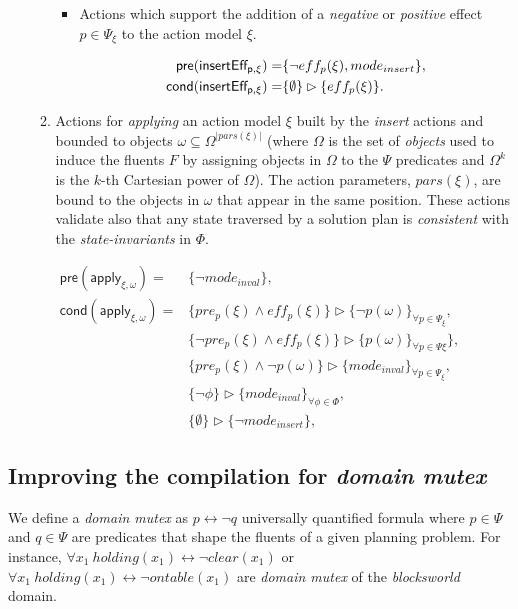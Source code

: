 \documentclass{article}
\newcommand{\pre}{\mathsf{pre}}     %
\newcommand{\cond}{\mathsf{cond}}   %
\begin{document}
\begin{itemize}
\begin{enumerate}
\begin{itemize}
\item Actions which support the addition of a {\em negative} or {\em positive} effect $p\in \Psi_{\xi}$ to the action model $\xi$. 

\begin{small}
\begin{align*}
\hspace*{7pt}\pre(\mathsf{insertEff_{p,\xi}})=&\{\neg eff_{p}(\xi), mode_{insert}\},\\
\cond(\mathsf{insertEff_{p,\xi}})=&\{\emptyset\}\rhd\{eff_{p}(\xi)\}.
\end{align*}
\end{small}
\end{itemize}

\item Actions for {\em applying} an action model $\xi$ built by the {\em insert} actions and bounded to objects $\omega\subseteq\Omega^{|pars(\xi)|}$ (where $\Omega$ is the set of {\em objects} used to induce the fluents $F$ by assigning objects in $\Omega$ to the $\Psi$ predicates and $\Omega^k$ is the $k$-th Cartesian power of $\Omega$). The action parameters, $pars(\xi)$, are bound to the objects in $\omega$ that appear in the same position. These actions validate also that any state traversed by a solution plan is {\em consistent} with the {\em state-invariants} in $\Phi$.
\end{enumerate}
\end{itemize}

\begin{small}
\begin{align*}
\pre(\mathsf{apply_{\xi,\omega}})=&\{\neg mode_{inval}\},\\
\cond(\mathsf{apply_{\xi,\omega}})=&\{pre_{p}(\xi)\wedge eff_{p}(\xi)\}\rhd\{\neg p(\omega)\}_{\forall p\in\Psi_\xi},\\
&\{\neg pre_{p}(\xi)\wedge eff_{p}(\xi)\}\rhd\{p(\omega)\}_{\forall p\in\Psi\xi}\},\\
&\{pre_{p}(\xi)\wedge \neg p(\omega)\}\rhd\{mode_{inval}\}_{\forall p\in\Psi_\xi},\\
&\{\neg\phi\}\rhd\{mode_{inval}\}_{\forall \phi\in\Phi},\\
&\{\emptyset\}\rhd\{\neg mode_{insert}\},
\end{align*}
\end{small}

\subsection{Improving the compilation for {\em domain mutex}}
We define a {\em domain mutex} as $p\leftrightarrow \neg q$ universally quantified formula where $p\in\Psi$ and $q\in\Psi$ are predicates that shape the fluents of a given planning problem. For instance, $\forall x_1\ holding(x_1)\leftrightarrow\neg clear(x_1)$  or $\forall x_1\ holding(x_1)\leftrightarrow\neg ontable(x_1)$ are {\em domain mutex} of the {\em blocksworld} domain.
\end{document}
